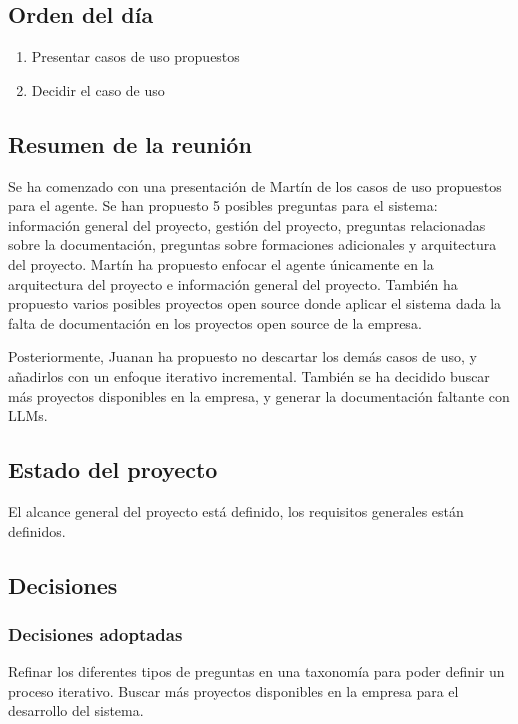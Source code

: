 \subsection{Orden del día}
\begin{enumerate}
    \item Presentar casos de uso propuestos
    \item Decidir el caso de uso
\end{enumerate}

\subsection{Resumen de la reunión}
Se ha comenzado con una presentación de Martín de los casos de uso propuestos para el agente. Se han propuesto 5 posibles preguntas para el sistema: información general del proyecto, gestión del proyecto, preguntas relacionadas sobre la documentación, preguntas sobre formaciones adicionales y arquitectura del proyecto. Martín ha propuesto enfocar el agente únicamente en la arquitectura del proyecto e información general del proyecto. También ha propuesto varios posibles proyectos open source donde aplicar el sistema dada la falta de documentación en los proyectos open source de la empresa. 

Posteriormente, Juanan ha propuesto no descartar los demás casos de uso, y añadirlos con un enfoque iterativo incremental. También se ha decidido buscar más proyectos disponibles en la empresa, y generar la documentación faltante con LLMs.

\subsection{Estado del proyecto}
El alcance general del proyecto está definido, los requisitos generales están definidos.

\subsection{Decisiones}
\subsubsection{Decisiones adoptadas}
Refinar los diferentes tipos de preguntas en una taxonomía para poder definir un proceso iterativo.
Buscar más proyectos disponibles en la empresa para el desarrollo del sistema.


